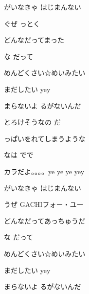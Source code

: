 \documentclass[a4paper,tate,twocolumn,12pt]{ltjtarticle}
\begin{document}
\begin{flushleft}
\vspace{2em}

\noindent\begin{minipage}{\linewidth}
がいなきゃ はじまんない

ぐぜ っとく

どんなだってまった

な だって

めんどくさい☆めいみたい

まだしたい yey

まらないよ るがないんだ
\end{minipage}

\vspace{2em}

\noindent\begin{minipage}{\linewidth}
とろけそうなの だ

っぱいをれてしまうような

なは でで

カラだよ。。。。ye ye ye yey
\end{minipage}

\vspace{2em}

\noindent\begin{minipage}{\linewidth}
がいなきゃ はじまんない

うぜ GACHIフォー・ユー

どんなだってあっちゅうだ

な だって

めんどくさい☆めいみたい

まだしたい yey

まらないよ るがないんだ
\end{minipage}

\end{flushleft}
\end{document}
